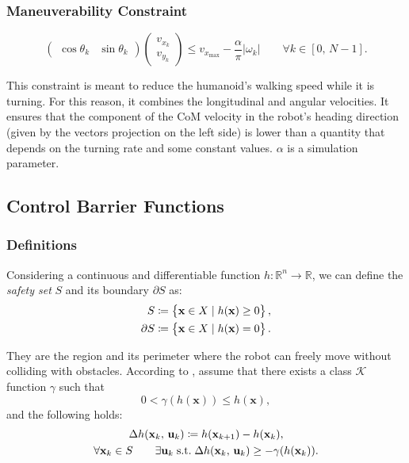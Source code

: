 \subsubsection{Maneuverability Constraint}
\[
\begin{pmatrix}
\cos \theta_k & \sin \theta_k
\end{pmatrix}
\begin{pmatrix}
v_{x_k} \\
v_{y_k}
\end{pmatrix}
\leq v_{x_{\max}} - \frac{\alpha}{\pi} |\omega_k|
\qquad \forall k \in \left[0,\, N-1 \right].
\]

This constraint is meant to reduce the humanoid's walking speed while it is turning. For this reason, it combines the longitudinal and angular velocities. It ensures that the component of the CoM velocity in the robot's heading direction (given by the vectors projection on the left side) is lower than a quantity that depends on the turning rate and some constant values. $\alpha$ is a simulation parameter.

\subsection{Control Barrier Functions}

\subsubsection{Definitions}
Considering a continuous and differentiable function $h: \mathbb{R}^n \rightarrow \mathbb{R}$, we can define the \textit{safety set} $S$ and its boundary $\partial S$ as:
\begin{align*}
S \coloneqq \left\{ \mathbf{x} \in X \mid  h(\mathbf{x}) \geq 0\right\}, \notag \\
\partial S \coloneqq \left\{ \mathbf{x} \in X \mid  h(\mathbf{x}) = 0\right\}. \notag  \\
\end{align*}

They are the region and its perimeter where the robot can freely move without colliding with obstacles.
According to \cite{zeng2021safetycriticalmodelpredictivecontrol}, %
assume that there exists a class $\mathcal{K}$ function $\gamma$ such that
$$
0 < \gamma(h(\mathbf{x})) \leq h(\mathbf{x}),
$$
and the following holds:
\begin{gather}
\Delta h(\mathbf{x}_k,\, \mathbf{u}_k) \coloneqq h(\mathbf{x}_{k+1}) - h(\mathbf{x}_{k}), \notag \\
\forall \mathbf{x}_k \in S \qquad \exists \mathbf{u}_k \; \text{s.t.} \; \Delta h(\mathbf{x}_k,\, \mathbf{u}_k) \geq -\gamma(h(\mathbf{x}_k)). \label{eq:dcbf_def_constr}
\end{gather}

